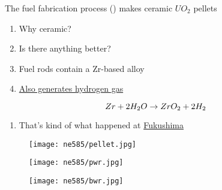 \documentclass[aspectratio=1610,pdftex,dvipsnames,compress,xcolor={dvipsnames}]{beamer}
\newcommand{\acsp}{\acrshortpl} %
\begin{document}
\addtocounter{framenumber}{-1} 
\begin{frame}{The fuel fabrication process (\acsp{lwr}) makes ceramic $UO_2$ pellets}
    \begin{enumerate}[series=outerlist,topsep=0pt,itemsep=21pt,leftmargin=*,label=(\arabic*)]
        \item[]Why ceramic?
        \item[]Is there anything better?
        \item[]Fuel rods contain a Zr-based alloy
        \item[]\href{https://inis.iaea.org/collection/NCLCollectionStore/_Public/47/032/47032411.pdf}{Also generates hydrogen gas}
    \end{enumerate}

    \vspace*{\fill}

    \begin{equation}
        \LARGE 
        Zr+2H_2O \rightarrow ZrO_2+2H_2
    \end{equation}
    
    \vspace*{\fill}

    \begin{enumerate}[series=outerlist,topsep=0pt,itemsep=21pt,leftmargin=*,label=(\arabic*)]
        \item[]That's kind of what happened at \href{https://www.nature.com/news/2011/110322/full/471417a.html}{Fukushima}
    \end{enumerate}
\end{frame}


\begin{frame}{}
    \begin{figure}
        \centering
        \texttt{[image: ne585/pellet.jpg]}
    \end{figure}
\end{frame}


\begin{frame}{}
    \begin{figure}
        \centering
        \texttt{[image: ne585/pwr.jpg]}
    \end{figure}
\end{frame}


\begin{frame}{}
    \begin{figure}
        \centering
        \texttt{[image: ne585/bwr.jpg]}
    \end{figure}
\end{frame}
\end{document}
